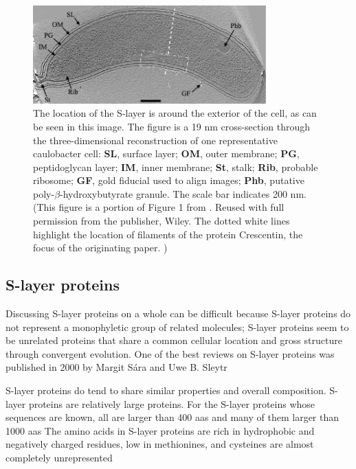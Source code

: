 \begin{figure}[htb]
  \begin{center}
    \includegraphics[width=0.8\textwidth]{intro/img/jensentomograph.jpg}
  \end{center}
  \caption[Electrotomograph of \ac{caulobacter}]{ The location of the \ac{S-layer} is around the exterior of the cell, as can be seen in this image. The figure is a 19
\si{\nano\meter} cross-section through the three-dimensional reconstruction of one representative \ac{caulobacter} cell: \textbf{SL}, surface layer; \textbf{OM}, outer membrane;
\textbf{PG}, peptidoglycan layer; \textbf{IM}, inner membrane; \textbf{St}, stalk; \textbf{Rib}, probable ribosome; \textbf{GF}, gold fiducial used to align images; \textbf{Phb},
putative poly-$\beta$-hydroxybutyrate granule. The scale bar indicates 200 \si{\nano\meter}. (This figure is a portion of Figure 1 from . Reused with full
permission from the publisher, Wiley. The dotted white lines highlight the location of filaments of the protein Crescentin, the focus of the originating paper. )}
  \label{fig:intro-tomo}
\end{figure}

\subsection{S-layer proteins} \label{sub:intro-slayerproteins} %

Discussing \ac{S-layer} proteins on a whole can be difficult because \ac{S-layer} proteins do not represent a monophyletic group of related molecules; \ac{S-layer} proteins seem to
be unrelated proteins that share a common cellular location and gross structure through convergent evolution. One of the best reviews on \ac{S-layer} proteins was published in 2000
by Margit S\'{a}ra and Uwe B. Sleytr

\ac{S-layer} proteins do tend to share similar properties and overall composition. \ac{S-layer} proteins are relatively large proteins. For the \ac{S-layer} proteins whose
sequences are known, all are larger than 400 \acp{aa} and many of them larger than 1000 \acp{aa} The amino acids in \ac{S-layer} proteins are rich in
hydrophobic and negatively charged residues, low in methionines, and cysteines are almost completely unrepresented

